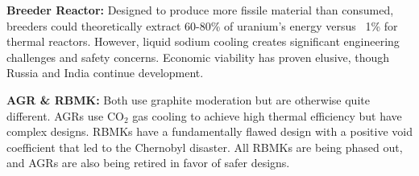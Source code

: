 \documentclass{article}
\begin{document}
\textbf{Breeder Reactor:} Designed to produce more fissile material than consumed, breeders could theoretically extract 60-80\% of uranium's energy versus ~1\% for thermal reactors. However, liquid sodium cooling creates significant engineering challenges and safety concerns. Economic viability has proven elusive, though Russia and India continue development.

\textbf{AGR \& RBMK:} Both use graphite moderation but are otherwise quite different. AGRs use CO$_2$ gas cooling to achieve high thermal efficiency but have complex designs. RBMKs have a fundamentally flawed design with a positive void coefficient that led to the Chernobyl disaster. All RBMKs are being phased out, and AGRs are also being retired in favor of safer designs.


\newpage
\end{document}
